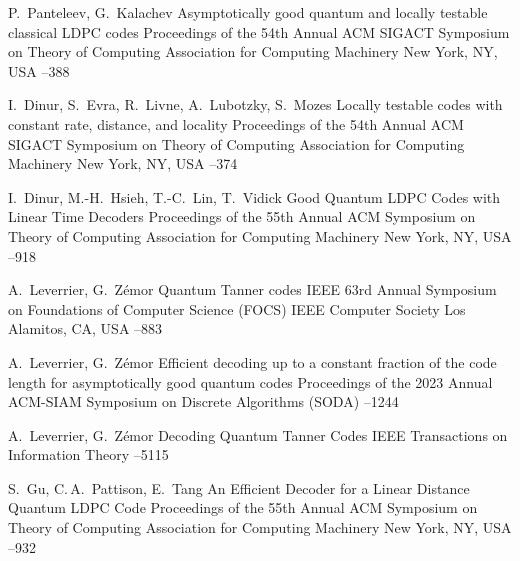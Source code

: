\by P.~Panteleev, G.~Kalachev
\paper Asymptotically good quantum and locally testable classical {LDPC} codes
\inbook Proceedings of the 54th Annual ACM SIGACT Symposium on Theory of Computing
\publ Association for Computing Machinery
\publaddr New York, NY, USA
--388

\by I.~Dinur, S.~Evra, R.~Livne, A.~Lubotzky, S.~Mozes
\paper Locally testable codes with constant rate, distance, and locality
\inbook Proceedings of the 54th Annual ACM SIGACT Symposium on Theory of Computing
\publ Association for Computing Machinery
\publaddr New York, NY, USA
--374

\by I.~Dinur, M.-H.~Hsieh, T.-C.~Lin, T.~Vidick
\paper Good Quantum LDPC Codes with Linear Time Decoders
\inbook Proceedings of the 55th Annual ACM Symposium on Theory of Computing
\publ Association for Computing Machinery
\publaddr New York, NY, USA
--918

\by A.~Leverrier, G.~{Z\'emor}
\paper Quantum Tanner codes
 IEEE 63rd Annual Symposium on Foundations of Computer Science (FOCS)
\publ IEEE Computer Society
\publaddr Los Alamitos, CA, USA
--883

\by A.~Leverrier, G.~{Z\'emor}
\paper Efficient decoding up to a constant fraction of the code length for asymptotically good quantum codes
\inbook Proceedings of the 2023 Annual ACM-SIAM Symposium on Discrete Algorithms (SODA)
--1244

\by A.~Leverrier, G.~{Z\'emor}
\paper Decoding Quantum Tanner Codes
\jour IEEE Transactions on Information Theory
--5115

\by S.~Gu, C.\,A.~Pattison, E.~Tang
\paper An Efficient Decoder for a Linear Distance Quantum LDPC Code
\inbook Proceedings of the 55th Annual ACM Symposium on Theory of Computing
\publ Association for Computing Machinery
\publaddr New York, NY, USA
--932

